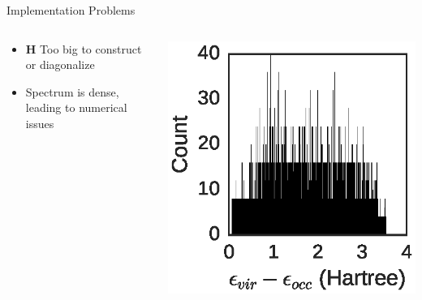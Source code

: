 \documentclass[10pt]{beamer}
\begin{document}
{{{{{{{{{\begin{frame}{Implementation Problems}
	\begin{columns}[c] %
		\begin{column}{.4\textwidth}
			\begin{itemize}
			  \item {$\mathbf{H}$ Too big to construct or diagonalize}
				\item {Spectrum is dense, leading to numerical issues}
			\end{itemize}
		\end{column}
		\hfill
		\begin{column}{0.6\textwidth}
		    \begin{overprint}
			    \includegraphics[width=\linewidth]{../figures/exchist.eps}
			\end{overprint}
		\end{column}
	\end{columns}
\end{frame}

{%

}}}}}}}}}}
\end{document}
